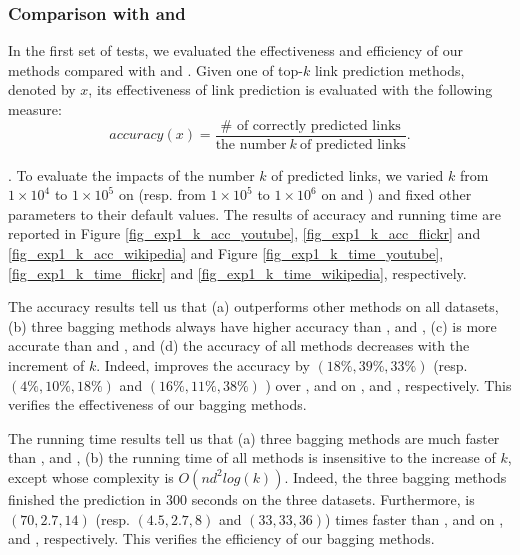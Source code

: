 \subsubsection{Comparison with \Aa and \BIGCLAM }



In the first set of tests,
we evaluated the effectiveness and efficiency of our methods compared with \Aa and
\BIGCLAM. Given one of top-$k$ link prediction methods, denoted by $x$, its effectiveness
of link prediction is evaluated with the following measure:
\begin{equation}
accuracy(x) = \frac{\# \textrm{ of correctly predicted links}}{\textrm{the number} \ k\ \textrm{of predicted links}}.
\end{equation}




. To evaluate the impacts of the number $k$ of predicted links, we varied $k$
from $1\times 10^4$ to $1\times 10^5$ on \YouTube (resp. from $1\times 10^5$ to $1\times 10^6$ on
\Flickr and \Wikipedia) and fixed other parameters to their default values.
The results of accuracy and running time are reported in Figure \ref{fig_exp1_k_acc_youtube},
\ref{fig_exp1_k_acc_flickr} and \ref{fig_exp1_k_acc_wikipedia} and Figure \ref{fig_exp1_k_time_youtube},
\ref{fig_exp1_k_time_flickr} and \ref{fig_exp1_k_time_wikipedia}, respectively.




The accuracy results tell us that (a) \Biased
outperforms other methods on all datasets, (b) three bagging methods always have higher accuracy than \NMF, \Aa
and \BIGCLAM,  (c) \NMF is more accurate
than \Aa and \BIGCLAM, and (d) the accuracy of all methods decreases with the increment of $k$.
Indeed, \Biased improves the accuracy by $(18\%, 39\%, 33\%)$ (resp. $(4\%, 10\%, 18\%)$
and $(16\%, 11\%, 38\%)$ ) over \NMF, \Aa and \BIGCLAM on \YouTube, \Flickr and \Wikipedia,
respectively. This verifies the effectiveness of our bagging methods.


The running time results tell us that (a) three
bagging methods are much faster than \NMF, \Aa and \BIGCLAM, (b) the running time of
all methods is insensitive to the increase of $k$, except \Aa whose complexity is
$O(nd^2log(k))$. Indeed, the three bagging methods finished the prediction in 300 seconds on the
three datasets. Furthermore, \Biased is $(70, 2.7, 14)$ (resp. $(4.5, 2.7, 8)$ and $(33, 33, 36)$) times faster than \NMF, \Aa and
\BIGCLAM on \YouTube, \Flickr and \Wikipedia, respectively. This verifies the
efficiency of our bagging methods.


